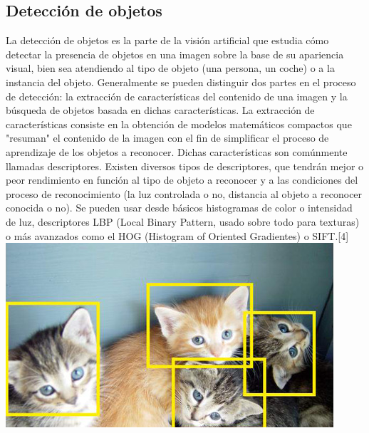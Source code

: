 \documentclass[twocolumn]{article}
\begin{document}
\subsection{Detección de objetos}
La detección de objetos es la parte de la visión artificial que estudia cómo detectar la presencia de objetos en una imagen sobre la base de su apariencia visual, bien sea atendiendo al tipo de objeto (una persona, un coche) o a la instancia del objeto.
Generalmente se pueden distinguir dos partes en el proceso de detección: la extracción de características del contenido de una imagen y la búsqueda de objetos basada en dichas características.
La extracción de características consiste en la obtención de modelos matemáticos compactos que "resuman" el contenido de la imagen con el fin de simplificar el proceso de aprendizaje de los objetos a reconocer. Dichas características son comúnmente llamadas descriptores.
Existen diversos tipos de descriptores, que tendrán mejor o peor rendimiento en función al tipo de objeto a reconocer y a las condiciones del proceso de reconocimiento (la luz controlada o no, distancia al objeto a reconocer conocida o no). Se pueden usar desde básicos histogramas de color o intensidad de luz, descriptores LBP (Local Binary Pattern, usado sobre todo para texturas) o más avanzados como el HOG (Histogram of Oriented Gradientes) o SIFT.[4]
\includegraphics[width=1.02\linewidth]{img/deteccion.jpg}
\end{document}
